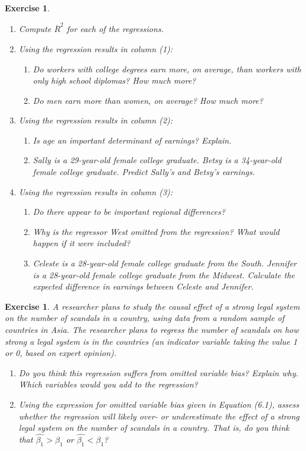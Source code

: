 \documentclass{article}
\newtheorem{exercise}[theorem]{Exercise}
\begin{document}
\begin{exercise}
    \begin{enumerate}[label=(\alph*)]
    \item Compute $\overline{R}^2$ for each of the regressions.
    \item Using the regression results in column (1):
    \begin{enumerate}[label=(\roman*)]
        \item Do workers with college degrees earn more, on average, than workers with only high school diplomas? How much more?
        \item Do men earn more than women, on average? How much more?
    \end{enumerate}
    \item Using the regression results in column (2):
    \begin{enumerate}[label=(\roman*)]
        \item Is age an important determinant of earnings? Explain.
        \item Sally is a 29-year-old female college graduate. Betsy is a 34-year-old female college graduate. Predict Sally’s and Betsy’s earnings.
    \end{enumerate}
    \item Using the regression results in column (3):
    \begin{enumerate}[label=(\roman*)]
        \item Do there appear to be important regional differences?
        \item Why is the regressor West omitted from the regression? What would happen if it were included?
        \item Celeste is a 28-year-old female college graduate from the South. Jennifer is a 28-year-old female college graduate from the Midwest. Calculate the expected difference in earnings between Celeste and Jennifer.
    \end{enumerate}
    \end{enumerate}
\end{exercise}



\begin{exercise}  %
A researcher plans to study the causal effect of a strong legal system on the
number of scandals in a country, using data from a random sample of countries
in Asia. The researcher plans to regress the number of scandals on how
strong a legal system is in the countries (an indicator variable taking the value
1 or 0, based on expert opinion).
    \begin{enumerate}[label=(\alph*)]
        \item Do you think this regression suffers from omitted variable bias? Explain why. Which variables would you add to the regression?
        \item Using the expression for omitted variable bias given in Equation (6.1), assess whether the regression will likely over- or underestimate the effect of a strong legal system on the number of scandals in a country. That is, do you think that $\hat{\beta_1}>\beta_1$ or $\hat{\beta_1}<\beta_1$?
    \end{enumerate}
\end{exercise}
\end{document}
